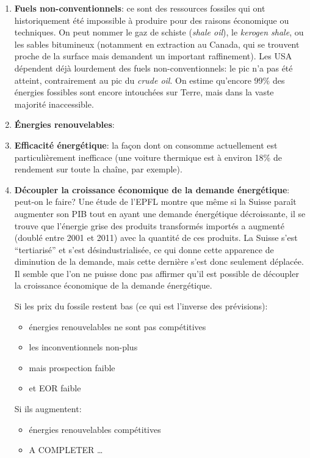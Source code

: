 \documentclass{article}
\begin{document}
	\begin{enumerate}
		\item \textbf{Fuels non-conventionnels}: ce sont des ressources fossiles qui ont historiquement été impossible à produire pour des raisons économique ou techniques. On peut nommer le gaz de schiste (\emph{shale oil}), le \emph{kerogen shale}, ou les sables bitumineux (notamment en extraction au Canada, qui se trouvent proche de la surface mais demandent un important raffinement). Les USA dépendent déjà lourdement des fuels non-conventionnels: le pic n'a pas été atteint, contrairement au pic du \emph{crude oil}. On estime qu'encore 99\% des énergies fossibles sont encore intouchées sur Terre, mais dans la vaste majorité inaccessible.
		\item \textbf{Énergies renouvelables}:
		\item \textbf{Efficacité énergétique}: la façon dont on consomme actuellement est particulièrement inefficace (une voiture thermique est à environ 18\% de rendement sur toute la chaîne, par exemple). 
		\item \textbf{Découpler la croissance économique de la demande énergétique}: peut-on le faire? Une étude de l'EPFL montre que même si la Suisse paraît augmenter son PIB tout en ayant une demande énergétique décroissante, il se trouve que l'énergie grise des produits transformés importés a augmenté (doublé entre 2001 et 2011) avec la quantité de ces produits. La Suisse s'est ``tertiarisé'' et s'est désindustrialisée, ce qui donne cette apparence de diminution de la demande, mais cette dernière s'est donc seulement déplacée. Il semble que l'on ne puisse donc pas affirmer qu'il est possible de découpler la croissance économique de la demande énergétique.\par
		Si les prix du fossile restent bas (ce qui est l'inverse des prévisions):
		\begin{itemize}
			\item énergies renouvelables ne sont pas compétitives
			\item les inconventionnels non-plus
			\item mais prospection faible
			\item et EOR faible
		\end{itemize}
		Si ils augmentent:
		\begin{itemize}
			\item énergies renouvelables compétitives
			\item A COMPLETER \dots
		\end{itemize}

\end{enumerate}
\end{document}
